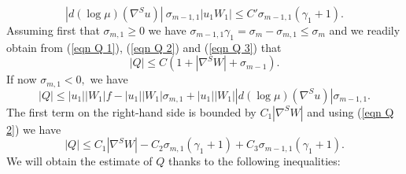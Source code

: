 \documentclass[10pt,reqno,oneside]{amsart}
\theoremstyle{definition}
\theoremstyle{remark}
\begin{document}
\begin{equation}\label{eqn Q 3}
|d(\log\mu)(\nabla^Su)|\ \sigma_{m-1,1}|u_1W_1|\leq C'\sigma_{m-1,1}(\gamma_1+1).
\end{equation}
Assuming first that $\sigma_{m,1}\geq 0$ we have $\sigma_{m-1,1}\gamma_1=\sigma_m-\sigma_{m,1}\leq\sigma_m$ and we readily obtain from (\ref{eqn Q 1}), (\ref{eqn Q 2}) and (\ref{eqn Q 3}) that
$$|Q|\leq C(1+|\nabla^S W|+\sigma_{m-1}).$$
If now $\sigma_{m,1}<0,$ we have
$$|Q|\leq |u_1||W_1|f-|u_1||W_1|\sigma_{m,1}+|u_1||W_1||d(\log\mu)(\nabla^Su)|\sigma_{m-1,1}.$$
The first term on the right-hand side is bounded by $C_1|\nabla^S W|$ and using (\ref{eqn Q 2}) we have 
\begin{equation}\label{est C2b est Q interm}
|Q|\leq C_1|\nabla^S W|-C_2\sigma_{m,1}(\gamma_1+1)+C_3\sigma_{m-1,1}(\gamma_1+1).
\end{equation}
We will obtain the estimate of $Q$ thanks to the following inequalities:
\end{document}
